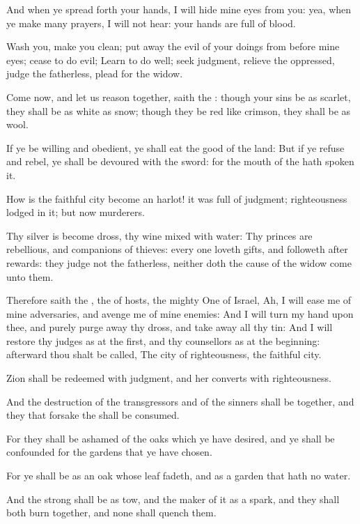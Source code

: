 \Verse And when ye spread forth your hands, I will hide mine eyes from you: yea, when ye make many prayers, I will not hear: your hands are full of blood.

\Verse Wash you, make you clean; put away the evil of your doings from before mine eyes; cease to do evil; \Verse Learn to do well; seek judgment, relieve the oppressed, judge the fatherless, plead for the widow.

\Verse Come now, and let us reason together, saith the \LORD: though your sins be as scarlet, they shall be as white as snow; though they be red like crimson, they shall be as wool.

\Verse If ye be willing and obedient, ye shall eat the good of the land: \Verse But if ye refuse and rebel, ye shall be devoured with the sword: for the mouth of the \LORD hath spoken it.

\Verse How is the faithful city become an harlot! it was full of judgment; righteousness lodged in it; but now murderers.

\Verse Thy silver is become dross, thy wine mixed with water: \Verse Thy princes are rebellious, and companions of thieves: every one loveth gifts, and followeth after rewards: they judge not the fatherless, neither doth the cause of the widow come unto them.

\Verse Therefore saith the \LORD, the \LORD of hosts, the mighty One of Israel, Ah, I will ease me of mine adversaries, and avenge me of mine enemies: \Verse And I will turn my hand upon thee, and purely purge away thy dross, and take away all thy tin: \Verse And I will restore thy judges as at the first, and thy counsellors as at the beginning: afterward thou shalt be called, The city of righteousness, the faithful city.

\Verse Zion shall be redeemed with judgment, and her converts with righteousness.

\Verse And the destruction of the transgressors and of the sinners shall be together, and they that forsake the \LORD shall be consumed.

\Verse For they shall be ashamed of the oaks which ye have desired, and ye shall be confounded for the gardens that ye have chosen.

\Verse For ye shall be as an oak whose leaf fadeth, and as a garden that hath no water.

\Verse And the strong shall be as tow, and the maker of it as a spark, and they shall both burn together, and none shall quench them.



